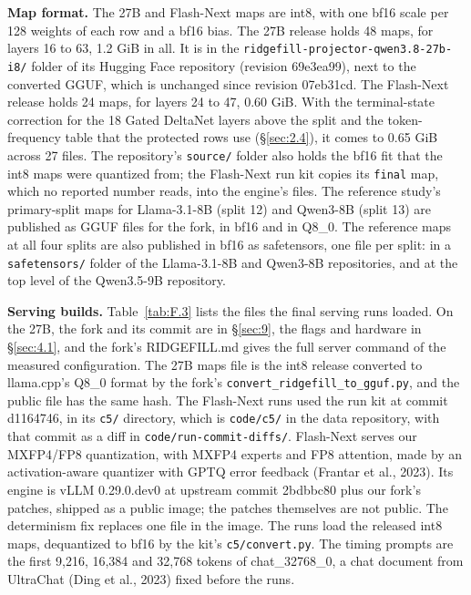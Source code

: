 \documentclass[11pt]{article}
\begin{document}
\textbf{Map format.} The 27B and Flash-Next maps are int8, with one bf16 scale per 128 weights of each row and a bf16 bias. The 27B release holds 48 maps, for layers 16 to 63, 1.2 GiB in all. It is in the \texttt{ridgefill-\allowbreak{}projector-\allowbreak{}qwen3.\allowbreak{}8-\allowbreak{}27b-\allowbreak{}i8/\allowbreak{}} folder of its Hugging Face repository (revision 69e3ea99), next to the converted GGUF, which is unchanged since revision 07eb31cd. The Flash-Next release holds 24 maps, for layers 24 to 47, 0.60 GiB. With the terminal-state correction for the 18 Gated DeltaNet layers above the split and the token-frequency table that the protected rows use (\S\ref{sec:2.4}), it comes to 0.65 GiB across 27 files. The repository's \texttt{source/\allowbreak{}} folder also holds the bf16 fit that the int8 maps were quantized from; the Flash-Next run kit copies its \texttt{final} map, which no reported number reads, into the engine's files. The reference study's primary-split maps for Llama-3.1-8B (split 12) and Qwen3-8B (split 13) are published as GGUF files for the fork, in bf16 and in Q8\_0. The reference maps at all four splits are also published in bf16 as safetensors, one file per split: in a \texttt{safetensors/\allowbreak{}} folder of the Llama-3.1-8B and Qwen3-8B repositories, and at the top level of the Qwen3.5-9B repository.

\textbf{Serving builds.} Table~\ref{tab:F.3} lists the files the final serving runs loaded. On the 27B, the fork and its commit are in \S\ref{sec:9}, the flags and hardware in \S\ref{sec:4.1}, and the fork's RIDGEFILL.md gives the full server command of the measured configuration. The 27B maps file is the int8 release converted to llama.cpp's Q8\_0 format by the fork's \texttt{convert\_\allowbreak{}ridgefill\_\allowbreak{}to\_\allowbreak{}gguf.\allowbreak{}py}, and the public file has the same hash. The Flash-Next runs used the run kit at commit d1164746, in its \texttt{c5/\allowbreak{}} directory, which is \texttt{code/\allowbreak{}c5/\allowbreak{}} in the data repository, with that commit as a diff in \texttt{code/\allowbreak{}run-\allowbreak{}commit-\allowbreak{}diffs/\allowbreak{}}. Flash-Next serves our MXFP4/FP8 quantization, with MXFP4 experts and FP8 attention, made by an activation-aware quantizer with GPTQ error feedback (Frantar et al., 2023). Its engine is vLLM 0.29.0.dev0 at upstream commit 2bdbbc80 plus our fork's patches, shipped as a public image; the patches themselves are not public. The determinism fix replaces one file in the image. The runs load the released int8 maps, dequantized to bf16 by the kit's \texttt{c5/\allowbreak{}convert.\allowbreak{}py}. The timing prompts are the first 9,216, 16,384 and 32,768 tokens of chat\_32768\_0, a chat document from UltraChat (Ding et al., 2023) fixed before the runs.
\end{document}
